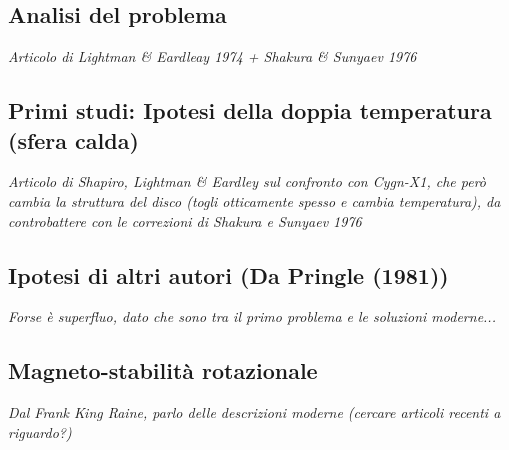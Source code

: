\documentclass[a4paper]{article}
\begin{document}
	\subsection{Analisi del problema}

		\emph{Articolo di Lightman \& Eardleay 1974 + Shakura \& Sunyaev 1976}

	\subsection{Primi studi: Ipotesi della doppia temperatura (sfera calda)}

		\emph{Articolo di Shapiro, Lightman \& Eardley sul confronto con Cygn-X1, che però cambia la struttura del disco (togli otticamente spesso e cambia temperatura), da controbattere con le correzioni di Shakura e Sunyaev 1976}\\
	
	\subsection{Ipotesi di altri autori (Da Pringle (1981))}
	
		\emph{Forse è superfluo, dato che sono tra il primo problema e le soluzioni moderne...}
		
	\subsection{Magneto-stabilità rotazionale}
		\emph{Dal Frank King Raine, parlo delle descrizioni moderne (cercare articoli recenti a riguardo?)}

\newpage
	
\end{document}
